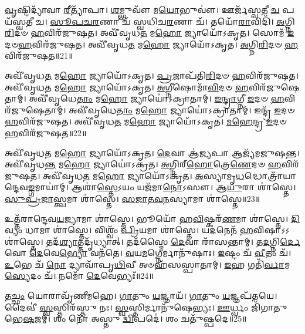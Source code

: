 \-\ul{𑌵𑍃}\-𑌷𑍍𑌟𑌿𑌦𑍍𑌯𑌾᳴𑌵𑌾 \ul{𑌰𑍀}\-𑌤𑍍𑌯𑌾᳴𑌪𑌾।
\-\ul{𑌶}\-𑌮𑍍𑌭𑍁𑌵𑍗᳴ 𑌮\-\ul{𑌯𑍋}\-𑌭𑍁𑌵𑍗॑।
𑌊𑌰𑍍𑌜᳴𑌸𑍍𑌵𑌤𑍀 \ul{𑌚} 𑌪𑌯᳴𑌸𑍍𑌵𑌤𑍀 𑌚।
\-\ul{𑌸𑍂}\-\-\ul{𑌪}\-\-\ul{𑌚}\-\-\ul{𑌰}\-𑌣𑌾 𑌚᳴ 𑌸𑍍𑌵𑌧𑌿𑌚\-\ul{𑌰}\-𑌣𑌾 𑌚᳴।
𑌤𑌯𑍋᳴\-\ul{𑌰𑌾}\-𑌵𑌿𑌦𑌿᳴।
\-\ul{𑌅}\-𑌗𑍍𑌨𑌿\-\ul{𑌰𑌿}\-𑌦𑍞 \ul{𑌹}\-𑌵𑌿𑌰᳴𑌜𑍁𑌷𑌤।
𑌅𑌵𑍀᳴𑌵𑍃𑌧\-\ul{𑌤} 𑌮\-\ul{𑌹𑍋} 𑌜𑍍𑌯𑌾𑌯𑍋᳴𑌽𑌕𑍃𑌤।
𑌸𑍋𑌮᳴ \ul{𑌇}\-𑌦𑍞\-\ul{𑌹}\-𑌵𑌿𑌰᳴𑌜𑍁𑌷𑌤।
𑌅𑌵𑍀᳴𑌵𑍃𑌧\-\ul{𑌤} 𑌮\-\ul{𑌹𑍋} 𑌜𑍍𑌯𑌾𑌯𑍋᳴𑌽𑌕𑍃𑌤।
\-\ul{𑌅}\-𑌗𑍍𑌨𑌿\-\ul{𑌰𑌿}\-𑌦𑍞 \ul{𑌹}\-𑌵𑌿𑌰᳴𑌜𑍁𑌷𑌤॥21॥

𑌅𑌵𑍀᳴𑌵𑍃𑌧\-\ul{𑌤} 𑌮\-\ul{𑌹𑍋} 𑌜𑍍𑌯𑌾𑌯𑍋᳴𑌽𑌕𑍃𑌤।
\-\ul{𑌪𑍍𑌰}\-𑌜𑌾𑌪᳴𑌤𑌿\-\ul{𑌰𑌿}\-𑌦𑍞 \ul{𑌹}\-𑌵𑌿𑌰᳴𑌜𑍁𑌷𑌤।
𑌅𑌵𑍀᳴𑌵𑍃𑌧\-\ul{𑌤} 𑌮\-\ul{𑌹𑍋} 𑌜𑍍𑌯𑌾𑌯𑍋᳴𑌽𑌕𑍃𑌤।
\-\ul{𑌅}\-𑌗𑍍𑌨𑍀𑌷𑍋𑌮𑌾᳴\-\ul{𑌵𑌿}\-𑌦𑍞 \ul{𑌹}\-𑌵𑌿𑌰᳴𑌜𑍁𑌷𑍇𑌤𑌾𑌮𑍍।
𑌅𑌵𑍀᳴𑌵𑍃𑌧𑍇\-\ul{𑌤𑌾𑌂} 𑌮\-\ul{𑌹𑍋} 𑌜𑍍𑌯𑌾𑌯𑍋॑\-𑌽𑌕𑍍𑌰𑌾𑌤𑌾𑌮𑍍।
\-\ul{𑌇}\-\-\ul{𑌨𑍍𑌦𑍍𑌰𑌾}\-𑌗𑍍𑌨𑍀 \ul{𑌇}\-𑌦𑍞 \ul{𑌹}\-𑌵𑌿𑌰᳴𑌜𑍁𑌷𑍇𑌤𑌾𑌮𑍍।
𑌅𑌵𑍀᳴𑌵𑍃𑌧𑍇\-\ul{𑌤𑌾𑌂} 𑌮\-\ul{𑌹𑍋} 𑌜𑍍𑌯𑌾𑌯𑍋॑\-𑌽𑌕𑍍𑌰𑌾𑌤𑌾𑌮𑍍।
𑌇𑌨𑍍𑌦𑍍𑌰᳴ \ul{𑌇}\-𑌦𑍞 \ul{𑌹}\-𑌵𑌿𑌰᳴𑌜𑍁𑌷𑌤।
𑌅𑌵𑍀᳴𑌵𑍃𑌧\-\ul{𑌤} 𑌮\-\ul{𑌹𑍋} 𑌜𑍍𑌯𑌾𑌯𑍋᳴𑌽𑌕𑍃𑌤।
\-\ul{𑌮}\-\-\ul{𑌹𑍇}\-𑌨𑍍𑌦𑍍𑌰 \ul{𑌇}\-𑌦𑍞 \ul{𑌹}\-𑌵𑌿𑌰᳴𑌜𑍁𑌷𑌤॥22॥

𑌅𑌵𑍀᳴𑌵𑍃𑌧\-\ul{𑌤} 𑌮\-\ul{𑌹𑍋} 𑌜𑍍𑌯𑌾𑌯𑍋᳴𑌽𑌕𑍃𑌤।
\-\ul{𑌦𑍇}\-𑌵𑌾 𑌆॑\-\ul{𑌜𑍍𑌯}\-𑌪𑌾 𑌆𑌜𑍍𑌯᳴𑌮𑌜𑍁𑌷𑌨𑍍𑌤।
𑌅𑌵𑍀᳴𑌵𑍃𑌧\-\ul{𑌨𑍍𑌤} 𑌮\-\ul{𑌹𑍋} 𑌜𑍍𑌯𑌾𑌯𑍋॑\-𑌽𑌕𑍍𑌰𑌤।
\-\ul{𑌅}\-𑌗𑍍𑌨𑌿𑌰𑍍‌\mbox{}\-\ul{𑌹𑍋}\-𑌤𑍍𑌰𑍇\-\ul{𑌣𑍇}\-𑌦𑍞 \ul{𑌹}\-𑌵𑌿𑌰᳴𑌜𑍁𑌷𑌤।
𑌅𑌵𑍀᳴𑌵𑍃𑌧\-\ul{𑌤} 𑌮\-\ul{𑌹𑍋} 𑌜𑍍𑌯𑌾𑌯𑍋᳴𑌽𑌕𑍃𑌤।
\-\ul{𑌅}\-𑌸𑍍𑌯𑌾𑌮𑍃\-\ul{𑌧}\-𑌦𑍍𑌧𑍋𑌤𑍍𑌰𑌾᳴𑌯𑌾𑌨𑍍𑌦𑍇𑌵\-\ul{𑌙𑍍𑌗}\-𑌮𑌾𑌯𑌾॑𑌮𑍍।
𑌆𑌶𑌾॑\-\ul{𑌸𑍍𑌤𑍇}\-𑌽𑌯𑌂 𑌯𑌜᳴𑌮𑌾\-\ul{𑌨𑍋}\-𑌽𑌸𑍗।
𑌆\-\ul{𑌯𑍁}\-𑌰𑌾 𑌶𑌾॑𑌸𑍍𑌤𑍇।
\-\ul{𑌸𑍁}\-\-\ul{𑌪𑍍𑌰}\-\-\ul{𑌜𑌾}\-𑌸𑍍𑌤𑍍𑌵𑌮𑌾 𑌶𑌾॑𑌸𑍍𑌤𑍇।
\-\ul{𑌸}\-\-\ul{𑌜𑌾}\-\-\ul{𑌤}\-\-\ul{𑌵}\-\-\ul{𑌨}\-𑌸𑍍𑌯𑌾𑌮𑌾 𑌶𑌾॑𑌸𑍍𑌤𑍇॥23॥

𑌉𑌤𑍍𑌤᳴𑌰𑌾𑌨𑍍𑌦𑍇𑌵\-\ul{𑌯}\-𑌜𑍍𑌯𑌾𑌮𑌾 𑌶𑌾॑𑌸𑍍𑌤𑍇।
𑌭𑍂𑌯𑍋᳴ 𑌹\-\ul{𑌵𑌿}\-𑌷𑍍𑌕𑌰᳴\-\ul{𑌣}\-𑌮𑌾 𑌶𑌾॑𑌸𑍍𑌤𑍇।
\-\ul{𑌦𑌿}\-𑌵𑍍𑌯𑌂 𑌧𑌾𑌮𑌾 𑌶𑌾॑𑌸𑍍𑌤𑍇।
𑌵𑌿𑌶𑍍𑌵𑌂᳴ \ul{𑌪𑍍𑌰𑌿}\-𑌯𑌮𑌾 𑌶𑌾॑𑌸𑍍𑌤𑍇।
𑌯\-\ul{𑌦}\-𑌨𑍇𑌨᳴ \ul{𑌹}\-𑌵𑌿𑌷𑌾\-𑌽𑌽𑌶𑌾॑𑌸𑍍𑌤𑍇।
𑌤𑌦᳴\-\ul{𑌶𑍍𑌯𑌾}\-𑌤𑍍𑌤𑌦𑍃᳴𑌧𑍍𑌯𑌾𑌤𑍍।
𑌤𑌦᳴𑌸𑍍𑌮𑍈 \ul{𑌦𑍇}\-𑌵𑌾 𑌰𑌾᳴𑌸𑌨𑍍𑌤𑌾𑌮𑍍।
𑌤\-\ul{𑌦}\-𑌗𑍍𑌨𑌿\-\ul{𑌰𑍍𑌦𑍇}\-𑌵𑍋 \ul{𑌦𑍇}\-𑌵𑍇\-\ul{𑌭𑍍𑌯𑍋} 𑌵𑌨᳴𑌤𑍇।
\-\ul{𑌵}\-𑌯\-\ul{𑌮}\-𑌗𑍍𑌨𑍇𑌰𑍍𑌮𑌾𑌨𑍁᳴𑌷𑌾𑌃।
\-\ul{𑌇}\-𑌷𑍍𑌟𑌂 𑌚᳴ \ul{𑌵𑍀}\-𑌤𑌂 𑌚᳴।
\-\ul{𑌉}\-𑌭𑍇 𑌚᳴ \ul{𑌨𑍋} 𑌦𑍍𑌯𑌾𑌵𑌾᳴𑌪𑍃\-\ul{𑌥𑌿}\-𑌵𑍀 𑌅𑍞𑌹᳴𑌸𑌸𑍍𑌪𑌾𑌤𑌾𑌮𑍍।
\-\ul{𑌇}\-𑌹 𑌗𑌤𑌿᳴\-\ul{𑌰𑍍𑌵𑌾}\-𑌮\-\ul{𑌸𑍍𑌯𑍇}\-𑌦𑌂 𑌚᳴।
𑌨𑌮𑍋᳴ \ul{𑌦𑍇}\-𑌵𑍇𑌭𑍍𑌯𑌃᳴॥24॥\anuvakamend[\-\ul{𑌅}\-\-\ul{𑌭}\-\-\ul{𑌯𑌂} 𑌕𑍃𑌤𑌾᳴𑌵𑌕𑍃\-\ul{𑌤𑌾}\-𑌗𑍍𑌨𑌿\-\ul{𑌰𑌿}\-𑌦𑍞 \ul{𑌹}\-𑌵𑌿𑌰᳴𑌜𑍁𑌷𑌤 𑌮\-\ul{𑌹𑍇}\-𑌨𑍍𑌦𑍍𑌰 \ul{𑌇}\-𑌦𑍞 \ul{𑌹}\-𑌵𑌿𑌰᳴𑌜𑍁𑌷𑌤 𑌸𑌜𑌾𑌤𑌵\-\ul{𑌨}\-𑌸𑍍𑌯𑌾𑌮𑌾 𑌶𑌾॑𑌸𑍍𑌤𑍇 \ul{𑌵𑍀}\-𑌤𑌂 \ul{𑌚} 𑌤𑍍𑌰𑍀𑌣𑌿᳴ 𑌚]

𑌤\-\ul{𑌚𑍍𑌛𑌂} 𑌯𑍋𑌰𑌾𑌵𑍃᳴𑌣𑍀𑌮𑌹𑍇।
\-\ul{𑌗𑌾}\-𑌤𑍁𑌂 \ul{𑌯}\-𑌜𑍍𑌞𑌾𑌯᳴।
\-\ul{𑌗𑌾}\-𑌤𑍁𑌂 \ul{𑌯}\-𑌜𑍍𑌞𑌪᳴𑌤𑌯𑍇।
𑌦𑍈𑌵𑍀॑ \ul{𑌸𑍍𑌵}\-𑌸𑍍𑌤𑌿𑌰᳴𑌸𑍍𑌤𑍁 𑌨𑌃।
\-\ul{𑌸𑍍𑌵}\-𑌸𑍍𑌤𑌿𑌰𑍍𑌮𑌾𑌨𑍁᳴𑌷𑍇𑌭𑍍𑌯𑌃।
\-\ul{𑌊}\-𑌰𑍍𑌧𑍍𑌵𑌂 𑌜𑌿᳴𑌗𑌾𑌤𑍁 𑌭𑍇\-\ul{𑌷}\-𑌜𑌮𑍍।
𑌶𑌂 𑌨𑍋᳴ 𑌅𑌸𑍍𑌤𑍁 \ul{𑌦𑍍𑌵𑌿}\-𑌪𑌦𑍇॑।
𑌶𑌂 𑌚𑌤𑍁᳴𑌷𑍍𑌪𑌦𑍇॥25॥\anuvakamend[𑌤\-\ul{𑌚𑍍𑌛𑌂} 𑌯𑍋\-\ul{𑌰}\-𑌷𑍍𑌟𑍗]

